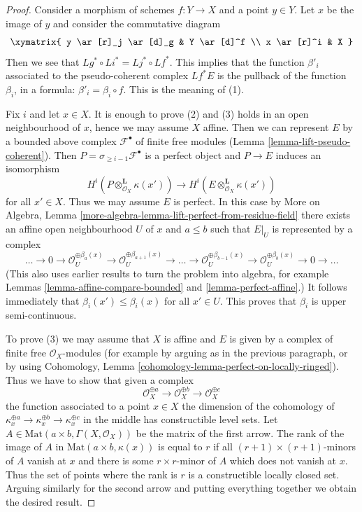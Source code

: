 \documentclass{stacks-project}
\theoremstyle{plain}
\theoremstyle{definition}
\theoremstyle{remark}
\numberwithin{equation}{subsection}
\begin{document}
\begin{proof}
Consider a morphism of schemes $f : Y \to X$ and a point $y \in Y$.
Let $x$ be the image of $y$ and consider the commutative diagram
$$
\xymatrix{
y \ar[r]_j \ar[d]_g & Y \ar[d]^f \\
x \ar[r]^i & X
}
$$
Then we see that $Lg^* \circ Li^* = Lj^* \circ Lf^*$. This implies that
the function $\beta'_i$ associated to the pseudo-coherent complex $Lf^*E$
is the pullback of the function $\beta_i$, in a formula:
$\beta'_i = \beta_i \circ f$. This is the meaning of (1).

\medskip\noindent
Fix $i$ and let $x \in X$. It is enough to prove (2) and (3)
holds in an open neighbourhood of $x$, hence we may assume $X$ affine.
Then we can represent $E$ by a bounded above complex $\mathcal{F}^\bullet$
of finite free modules (Lemma \ref{lemma-lift-pseudo-coherent}).
Then $P = \sigma_{\geq i - 1}\mathcal{F}^\bullet$ is a perfect object
and $P \to E$ induces an isomorphism
$$
H^i(P \otimes_{\mathcal{O}_X}^\mathbf{L} \kappa(x')) \to
H^i(E \otimes_{\mathcal{O}_X}^\mathbf{L} \kappa(x'))
$$
for all $x' \in X$. Thus we may assume $E$ is perfect. In this case
by More on Algebra, Lemma
\ref{more-algebra-lemma-lift-perfect-from-residue-field}
there exists an affine open neighbourhood $U$ of $x$ and
$a \leq b$ such that $E|_U$ is represented by a complex
$$
\ldots \to 0 \to \mathcal{O}_U^{\oplus \beta_a(x)}
\to \mathcal{O}_U^{\oplus \beta_{a + 1}(x)} \to
\ldots \to
\mathcal{O}_U^{\oplus \beta_{b - 1}(x)} \to
\mathcal{O}_U^{\oplus \beta_b(x)} \to 0
\to \ldots
$$
(This also uses earlier results to turn the problem into algebra, for example
Lemmas \ref{lemma-affine-compare-bounded} and
\ref{lemma-perfect-affine}.)
It follows immediately that $\beta_i(x') \leq \beta_i(x)$
for all $x' \in U$. This proves that $\beta_i$ is upper
semi-continuous.

\medskip\noindent
To prove (3) we may assume that $X$ is affine and
$E$ is given by a complex of finite
free $\mathcal{O}_X$-modules (for example by arguing as in the previous
paragraph, or by using Cohomology, Lemma
\ref{cohomology-lemma-perfect-on-locally-ringed}).
Thus we have to show that given a complex
$$
\mathcal{O}_X^{\oplus a} \to
\mathcal{O}_X^{\oplus b} \to
\mathcal{O}_X^{\oplus c}
$$
the function associated to a point $x \in X$ the dimension of the cohomology
of $\kappa_x^{\oplus a} \to \kappa_x^{\oplus b} \to \kappa_x^{\oplus c}$
in the middle has constructible level sets. Let
$A \in \text{Mat}(a \times b, \Gamma(X, \mathcal{O}_X))$ be the matrix
of the first arrow. The rank of the image of $A$ in
$\text{Mat}(a \times b, \kappa(x))$ is equal to $r$ if all
$(r + 1) \times (r + 1)$-minors of $A$ vanish at $x$ and there is some
$r \times r$-minor of $A$ which does not vanish at $x$. Thus the set
of points where the rank is $r$ is a constructible locally closed set.
Arguing similarly for the second arrow and putting everything together
we obtain the desired result.
\end{proof}
\end{document}
